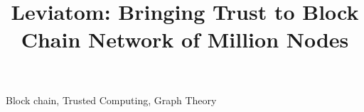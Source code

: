 \documentclass[10pt, conference, compsocconf]{IEEEtran}
\begin{document}
\title{Leviatom: Bringing Trust to Block Chain Network of Million Nodes}



\maketitle






\begin{IEEEkeywords}
Block chain, Trusted Computing, Graph Theory 

\end{IEEEkeywords}


\IEEEpeerreviewmaketitle







\balance


\end{document}
